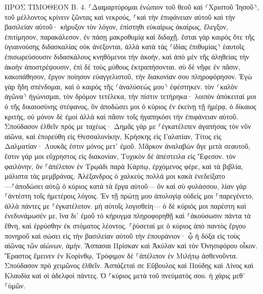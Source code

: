 \documentclass[twoside, 9pt]{extreport}
\begin{document}
ΠΡΟΣ ΤΙΜΟΘΕΟΝ Β.
4.
⸀Διαμαρτύρομαι ἐνώπιον τοῦ θεοῦ καὶ ⸂Χριστοῦ Ἰησοῦ⸃, τοῦ μέλλοντος κρίνειν ζῶντας καὶ νεκρούς, ⸀καὶ τὴν ἐπιφάνειαν αὐτοῦ καὶ τὴν βασιλείαν αὐτοῦ· 
κήρυξον τὸν λόγον, ἐπίστηθι εὐκαίρως ἀκαίρως, ἔλεγξον, ἐπιτίμησον, παρακάλεσον, ἐν πάσῃ μακροθυμίᾳ καὶ διδαχῇ. 
ἔσται γὰρ καιρὸς ὅτε τῆς ὑγιαινούσης διδασκαλίας οὐκ ἀνέξονται, ἀλλὰ κατὰ τὰς ⸂ἰδίας ἐπιθυμίας⸃ ἑαυτοῖς ἐπισωρεύσουσιν διδασκάλους κνηθόμενοι τὴν ἀκοήν, 
καὶ ἀπὸ μὲν τῆς ἀληθείας τὴν ἀκοὴν ἀποστρέψουσιν, ἐπὶ δὲ τοὺς μύθους ἐκτραπήσονται. 
σὺ δὲ νῆφε ἐν πᾶσιν, κακοπάθησον, ἔργον ποίησον εὐαγγελιστοῦ, τὴν διακονίαν σου πληροφόρησον. 
Ἐγὼ γὰρ ἤδη σπένδομαι, καὶ ὁ καιρὸς τῆς ⸂ἀναλύσεώς μου⸃ ἐφέστηκεν. 
τὸν ⸂καλὸν ἀγῶνα⸃ ἠγώνισμαι, τὸν δρόμον τετέλεκα, τὴν πίστιν τετήρηκα· 
λοιπὸν ἀπόκειταί μοι ὁ τῆς δικαιοσύνης στέφανος, ὃν ἀποδώσει μοι ὁ κύριος ἐν ἐκείνῃ τῇ ἡμέρᾳ, ὁ δίκαιος κριτής, οὐ μόνον δὲ ἐμοὶ ἀλλὰ καὶ πᾶσιν τοῖς ἠγαπηκόσι τὴν ἐπιφάνειαν αὐτοῦ. 
Σπούδασον ἐλθεῖν πρός με ταχέως· 
Δημᾶς γάρ με ⸀ἐγκατέλιπεν ἀγαπήσας τὸν νῦν αἰῶνα, καὶ ἐπορεύθη εἰς Θεσσαλονίκην, Κρήσκης εἰς Γαλατίαν, Τίτος εἰς Δαλματίαν· 
Λουκᾶς ἐστιν μόνος μετ᾽ ἐμοῦ. Μᾶρκον ἀναλαβὼν ἄγε μετὰ σεαυτοῦ, ἔστιν γάρ μοι εὔχρηστος εἰς διακονίαν, 
Τυχικὸν δὲ ἀπέστειλα εἰς Ἔφεσον. 
τὸν φαιλόνην, ὃν ⸀ἀπέλιπον ἐν Τρῳάδι παρὰ Κάρπῳ, ἐρχόμενος φέρε, καὶ τὰ βιβλία, μάλιστα τὰς μεμβράνας. 
Ἀλέξανδρος ὁ χαλκεὺς πολλά μοι κακὰ ἐνεδείξατο—⸀ἀποδώσει αὐτῷ ὁ κύριος κατὰ τὰ ἔργα αὐτοῦ— 
ὃν καὶ σὺ φυλάσσου, λίαν γὰρ ⸀ἀντέστη τοῖς ἡμετέροις λόγοις. 
Ἐν τῇ πρώτῃ μου ἀπολογίᾳ οὐδείς μοι ⸀παρεγένετο, ἀλλὰ πάντες με ⸀ἐγκατέλιπον. μὴ αὐτοῖς λογισθείη— 
ὁ δὲ κύριός μοι παρέστη καὶ ἐνεδυνάμωσέν με, ἵνα δι᾽ ἐμοῦ τὸ κήρυγμα πληροφορηθῇ καὶ ⸀ἀκούσωσιν πάντα τὰ ἔθνη, καὶ ἐρρύσθην ἐκ στόματος λέοντος. 
⸀ῥύσεταί με ὁ κύριος ἀπὸ παντὸς ἔργου πονηροῦ καὶ σώσει εἰς τὴν βασιλείαν αὐτοῦ τὴν ἐπουράνιον· ᾧ ἡ δόξα εἰς τοὺς αἰῶνας τῶν αἰώνων, ἀμήν. 
Ἄσπασαι Πρίσκαν καὶ Ἀκύλαν καὶ τὸν Ὀνησιφόρου οἶκον. 
Ἔραστος ἔμεινεν ἐν Κορίνθῳ, Τρόφιμον δὲ ⸀ἀπέλιπον ἐν Μιλήτῳ ἀσθενοῦντα. 
Σπούδασον πρὸ χειμῶνος ἐλθεῖν. Ἀσπάζεταί σε Εὔβουλος καὶ Πούδης καὶ Λίνος καὶ Κλαυδία καὶ οἱ ἀδελφοὶ πάντες. 
Ὁ ⸀κύριος μετὰ τοῦ πνεύματός σου. ἡ χάρις μεθ᾽ ⸀ὑμῶν. 
\end{document}

